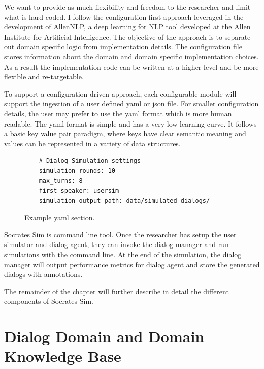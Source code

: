 We want to provide as much flexibility and freedom to the researcher and limit what is hard-coded. I follow the configuration first approach leveraged in the development of AllenNLP, a deep learning for NLP tool developed at the Allen Institute for Artificial Intelligence. The objective of the approach is to separate out domain specific logic from implementation details. The configuration file stores information about the domain and domain specific implementation choices. As a result the implementation code can be written at a higher level and be more flexible and re-targetable. 

To support a configuration driven approach, each configurable module will support the ingestion of a user defined yaml or json file. For smaller configuration details, the user may prefer to use the yaml format which is more human readable. The yaml format is simple and has a very low learning curve. It follows a basic key value pair paradigm, where keys have clear semantic meaning and values can be represented in a variety of data structures. 

\begin{figure}[h!]
	\begin{lstlisting}
	# Dialog Simulation settings
	simulation_rounds: 10
	max_turns: 8
	first_speaker: usersim
	simulation_output_path: data/simulated_dialogs/
	\end{lstlisting}
	\caption{Example yaml section.}
	\label{fig:ex_yaml}
\end{figure}

Socrates Sim is command line tool. Once the researcher has setup the user simulator and dialog agent, they can invoke the dialog manager and run simulations with the command line. At the end of the simulation, the dialog manager will output performance metrics for dialog agent and store the generated dialogs with annotations.

The remainder of the chapter will further describe in detail the different components of Socrates Sim.

\section{Dialog Domain and Domain Knowledge Base}
\label{sssec:dialog_domain}

